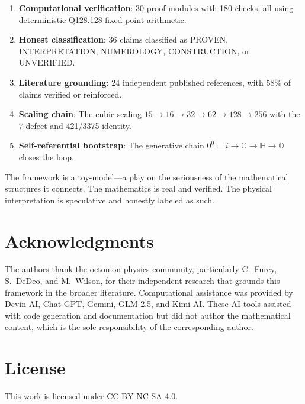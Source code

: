 \documentclass[11pt]{article}
\begin{document}
\begin{enumerate}
\item \textbf{Computational verification}: 30 proof modules with 180 checks, all using deterministic Q128.128 fixed-point arithmetic.
\item \textbf{Honest classification}: 36 claims classified as PROVEN, INTERPRETATION, NUMEROLOGY, CONSTRUCTION, or UNVERIFIED.
\item \textbf{Literature grounding}: 24 independent published references, with 58\% of claims verified or reinforced.
\item \textbf{Scaling chain}: The cubic scaling $15 \to 16 \to 32 \to 62 \to 128 \to 256$ with the 7-defect and 421/3375 identity.
\item \textbf{Self-referential bootstrap}: The generative chain $0^0 = i \to \mathbb{C} \to \mathbb{H} \to \mathbb{O}$ closes the loop.
\end{enumerate}

The framework is a toy-model---a play on the seriousness of the mathematical structures it connects. The mathematics is real and verified. The physical interpretation is speculative and honestly labeled as such.

\section*{Acknowledgments}

The authors thank the octonion physics community, particularly C.\ Furey, S.\ DeDeo, and M.\ Wilson, for their independent research that grounds this framework in the broader literature. Computational assistance was provided by Devin AI, Chat-GPT, Gemini, GLM-2.5, and Kimi AI. These AI tools assisted with code generation and documentation but did not author the mathematical content, which is the sole responsibility of the corresponding author.

\section*{License}

This work is licensed under CC BY-NC-SA 4.0.



\end{document}
